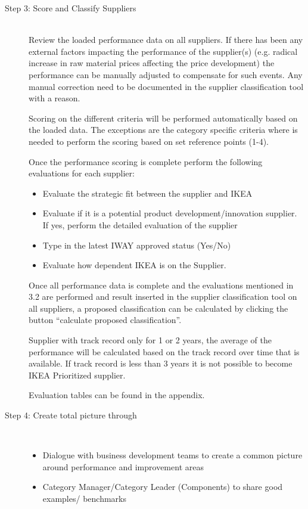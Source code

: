 \documentclass[oneside,12pt]{article}%
\begin{document}
\begin{description}
  \item[Step 3: Score and Classify Suppliers] \hfill \\
  Review the loaded performance data on all suppliers. If there has been any external factors impacting the performance of the supplier(s) (e.g. radical increase in raw material prices affecting the price development) the performance can be manually adjusted to compensate for such events. Any manual correction need to be documented in the supplier classification tool with a reason. \par
  Scoring on the different criteria will be performed automatically based on the loaded data. The exceptions are the category specific criteria where is needed to perform the scoring based on set reference points (1-4). \par
  Once the performance scoring is complete perform the following evaluations for each supplier:
  \begin{itemize}
    \item Evaluate the strategic fit between the supplier and IKEA
    \item Evaluate if it is a potential product development/innovation supplier. If yes, perform the detailed evaluation of the supplier
    \item Type in the latest IWAY approved status (Yes/No)
    \item Evaluate how dependent IKEA is on the Supplier.
  \end{itemize}

  Once all performance data is complete and the evaluations mentioned in 3.2 are performed and result inserted in the supplier classification tool on all suppliers, a proposed classification can be calculated by clicking the button “calculate proposed classification”. \par
  Supplier with track record only for 1 or 2 years, the average of the performance will be calculated based on the track record over time that is available. If track record is less than 3 years it is not possible to become IKEA Prioritized supplier. \par
  Evaluation tables can be found in the appendix.

  \item[Step 4: Create total picture through] \hfill \\
  \begin{itemize}
    \item Dialogue with business development teams to create a common picture around performance and improvement areas
    \item Category Manager/Category Leader (Components) to share good examples/ benchmarks
  \end{itemize}


\end{description}
\end{document}
